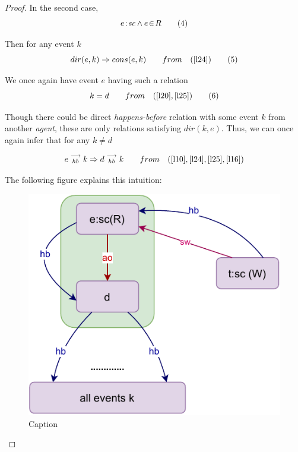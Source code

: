 \begin{proof}
        In the second case,
        \[
            e\!:\!\textit{sc} \wedge e\!\in\!R
            \tag{4}
            \label{l24}
        \]
        
        Then for any event $k$
        \[
            dir(e,k) \Rightarrow cons(e,k)
            \qquad from \quad
            (\ref{l24})
            \tag{5}
            \label{l25}
        \]
        
        We once again have event $e$ having such a relation 
        \[
            k = d 
            \qquad from \quad
            (\ref{l20}, \ref{l25})
            \tag{6}
            \label{l26}
        \]
        
        Though there could be direct \textit{happens-before} relation with some event $k$ from another \textit{agent}, these are only relations satisfying $dir(k,e)$. Thus, we can once again infer that for any $k \neq d$ 
        
        \[
            e\stackrel{\longrightarrow}{_{hb}}k \Rightarrow d\stackrel{\longrightarrow}{_{hb}}k
            \qquad from \quad
            (\ref{l10}, \ref{l24},  \ref{l25}, \ref{l16})
        \]
        
        The following figure explains this intuition: 
        
        \begin{figure}[H]
            \centering
            \includegraphics[scale=0.7]{Lemma_Proof2_Case2.pdf}
            \caption{Caption}
            \label{fig:my_label}
        \end{figure}

    \end{proof}
    
